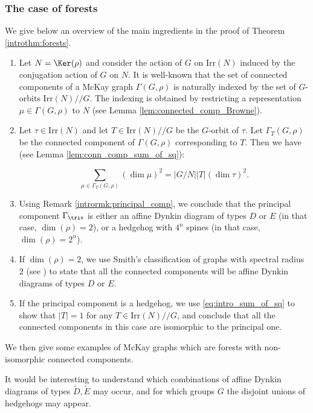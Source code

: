\subsubsection{The case of forests}
{We give below an overview of the main ingredients in the proof of Theorem \ref{introthm:forests}.}
{
\begin{enumerate}[label=(\alph*)]
    \item Let $N=\Ker(\rho)$ and consider the action of $G$ on $\mathrm{Irr}(N)$ induced by the conjugation action of $G$ on $N$. It is well-known that the set of connected components of a McKay graph $\Gamma(G,\rho)$ is naturally indexed by the set of $G$-orbits $\mathrm{Irr}(N)//G$. The indexing is obtained by restricting a representation $\mu\in  \Gamma(G,\rho)$ to $N$ (see Lemma \ref{lem:connected_comp_Browne}).
    \item Let $\tau\in \mathrm{Irr}(N)$ and let $T\in \mathrm{Irr}(N)//G$ be the $G$-orbit of $\tau$. Let $\Gamma_T(G,\rho)$ be the connected component of $\Gamma(G,\rho)$ corresponding to $T$. Then we have (see Lemma \ref{lem:conn_comp_sum_of_sq}):
    
    \begin{equation}\label{eq:intro_sum_of_sq}
     \sum_{\mu\in \Gamma_T(G,\rho)} (\dim \mu)^2=|G/N||T|(\dim\tau)^2.
    \end{equation}
\item Using Remark \ref{intrormk:principal_comp}, we conclude that the principal component $\Gamma_\triv$ is either an affine Dynkin diagram of types $D$ or $E$ (in that case, $\dim(\rho)=2$), or a hedgehog with $4^n$ spines (in that case, $\dim(\rho)=2^n$). 
\item If $\dim(\rho)=2$, we use {Smith's} classification of graphs with spectral radius $2$ (see \cite{Smith}) to state that all the connected components will be affine Dynkin diagrams of types $D$ or $E$.
\item If the principal component is a hedgehog, we use  \eqref{eq:intro_sum_of_sq} to show that $|T|=1$ for any $T\in \mathrm{Irr}(N)//G$, and conclude that all the connected components in this case are isomorphic to the principal one.
\end{enumerate}
}
We then give some examples of McKay graphs which are forests with non-isomorphic connected components. 

{It would be interesting to understand which combinations of affine Dynkin diagrams of types $\tilde{D}, \tilde{E}$ may occur, and for which groups $G$ the disjoint unions of hedgehogs may appear.}


